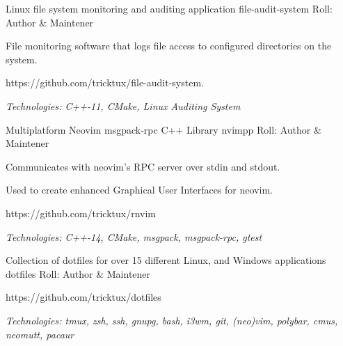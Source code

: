

\begin{cventries}
  \cventry
  {Linux file system monitoring and auditing application} %
  {file-audit-system} %
  {} %
  {Roll: Author \& Maintener} %
  {
    \begin{cvitems} %
    \item {File monitoring software that logs file access to configured directories on the system.}
    \item {https://github.com/tricktux/file-audit-system.}
    \item {\it{Technologies:} C++-11, CMake, Linux Auditing System}
    \end{cvitems}
  }

	\cventry
		{Multiplatform Neovim msgpack-rpc C++ Library} %
		{nvimpp} %
		{} %
		{Roll: Author \& Maintener} %
		{
			\begin{cvitems} %
				\item {Communicates with neovim's RPC server over stdin and stdout.}
				\item {Used to create enhanced Graphical User Interfaces for neovim.}
				\item {https://github.com/tricktux/rnvim}
				\item {\it{Technologies:} C++-14, CMake, msgpack, msgpack-rpc, gtest}
			\end{cvitems}
		}

  \cventry
		{Collection of dotfiles for over 15 different Linux, and Windows applications} %
    {dotfiles} %
    {} %
		{Roll: Author \& Maintener} %
    {
      \begin{cvitems} %
				\item {https://github.com/tricktux/dotfiles}
				\item {\it{Technologies:} tmux, zsh, ssh, gnupg, bash, i3wm, git, (neo)vim, polybar, cmus, neomutt, pacaur}
      \end{cvitems}
    }


\end{cventries}
